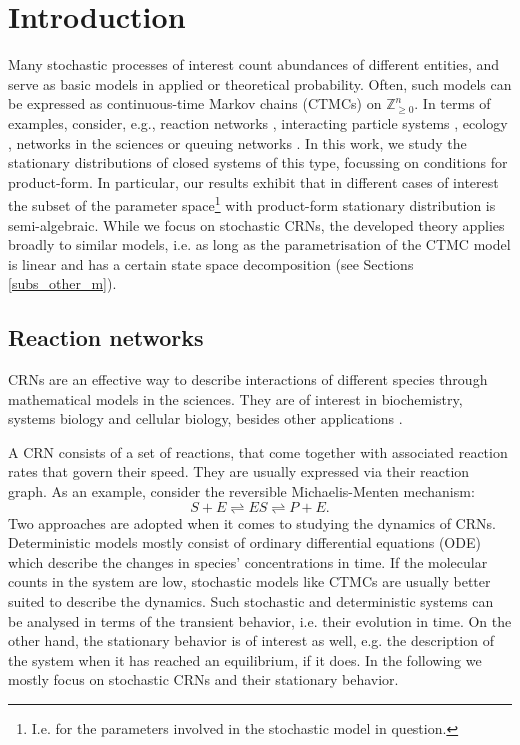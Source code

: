 \documentclass{amsart}
\theoremstyle{definition}
\theoremstyle{remark}
\theoremstyle{Conjecture/open problem}
\theoremstyle{assumption}
\theoremstyle{conjecture}
\def\Z{\mathbb{Z}}
\numberwithin{equation}{section}
\begin{document}
\section{Introduction}\label{intro_s}
 Many stochastic processes of interest count abundances of different entities, and serve as basic models in applied or theoretical probability. Often, such models can be expressed as
 continuous-time Markov chains (CTMCs) on $\Z_{\geq 0}^n$. In terms of examples, consider, e.g., reaction networks \cite{mcquarrie_1967}, interacting particle systems \cite{liggett}, ecology \cite{ecol_May}, networks in the sciences \cite{Goutsias_ov} or queuing networks \cite{serfozo}. In this work, we study the stationary distributions of closed systems of this type, 
 focussing on conditions for product-form. In particular, our results exhibit that in different cases of interest the subset of the parameter space\footnote{I.e. for the parameters involved in the stochastic model in question.} with product-form stationary distribution is semi-algebraic. While we focus on stochastic CRNs, the developed theory applies broadly to similar models, i.e. as long as the parametrisation of the CTMC model  is linear and has a certain state space decomposition (see Sections \ref{subs_other_m}). 

\subsection{Reaction networks}

CRNs are an effective way  
to describe interactions of different species through mathematical models in the sciences.
They are of interest in 
 biochemistry, systems biology and cellular biology, 
besides 
other applications \cite{Goutsias_ov,overv_Gorban,gardiner}.

A CRN consists of a set of reactions, that come together with associated reaction rates that govern their speed. They are usually expressed via their reaction graph. 
As an example, consider the reversible Michaelis-Menten mechanism:
\begin{equation}%
S+E\rightleftharpoons ES\rightleftharpoons P+E.\end{equation}
Two approaches are adopted when it comes to studying the dynamics of CRNs. 
Deterministic models mostly consist 
 of ordinary differential equations (ODE) which describe  
 the changes in species' concentrations in time.
If the molecular counts in the system are low, stochastic models like CTMCs are usually better suited to describe the dynamics. Such stochastic and deterministic systems can be analysed in terms of the transient behavior, i.e. their evolution in time. On the other hand, the stationary behavior is of interest as well, e.g. the description of the system when it has reached an equilibrium, if it does. 
In the following we mostly focus on stochastic CRNs and their stationary behavior.
\end{document}
